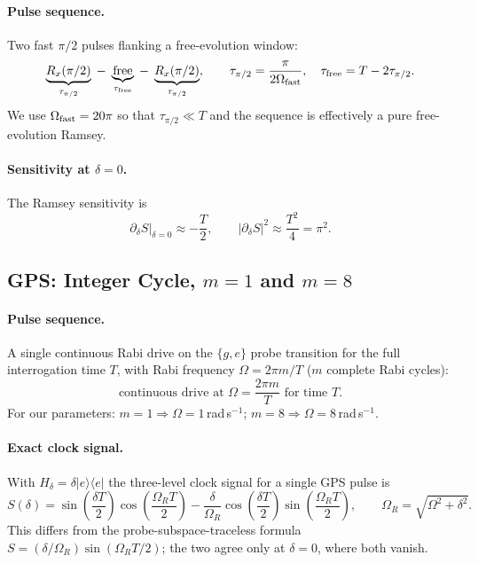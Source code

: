 \documentclass[12pt]{article}
\begin{document}
\paragraph{Pulse sequence.}
Two fast $\pi/2$ pulses flanking a free-evolution window:
\begin{equation}
    \underbrace{R_x(\pi/2)}_{\tau_{\pi/2}}
    \;-\;
    \underbrace{\text{free}}_{\tau_{\rm free}}
    \;-\;
    \underbrace{R_x(\pi/2)}_{\tau_{\pi/2}},
    \qquad
    \tau_{\pi/2} = \frac{\pi}{2\Omega_{\rm fast}},
    \quad
    \tau_{\rm free} = T - 2\tau_{\pi/2}.
    \label{eq:ramsey_seq}
\end{equation}
We use $\Omega_{\rm fast} = 20\pi$ so that $\tau_{\pi/2} \ll T$ and the sequence
is effectively a pure free-evolution Ramsey.

\paragraph{Sensitivity at $\delta = 0$.}
The Ramsey sensitivity is
\begin{equation}
    \left.\partial_\delta S\right|_{\delta=0}
    \approx -\frac{T}{2},
    \qquad
    \left|\partial_\delta S\right|^2 \approx \frac{T^2}{4} = \pi^2.
    \label{eq:ramsey_sens}
\end{equation}


\subsection{GPS: Integer Cycle, $m = 1$ and $m = 8$}

\paragraph{Pulse sequence.}
A single continuous Rabi drive on the $\{g,e\}$ probe transition for the full
interrogation time $T$, with Rabi frequency $\Omega = 2\pi m / T$ ($m$ complete
Rabi cycles):
\begin{equation}
    \text{continuous drive at }\Omega = \frac{2\pi m}{T}\text{ for time }T.
    \label{eq:gps_seq}
\end{equation}
For our parameters: $m=1 \Rightarrow \Omega = 1$\,rad\,s$^{-1}$;
$m=8 \Rightarrow \Omega = 8$\,rad\,s$^{-1}$.

\paragraph{Exact clock signal.}
With $H_\delta = \delta\lvert e\rangle\langle e\rvert$ the three-level clock
signal for a single GPS pulse is
\begin{equation}
    S(\delta) = \sin\!\left(\frac{\delta T}{2}\right)\cos\!\left(\frac{\Omega_R T}{2}\right)
              - \frac{\delta}{\Omega_R}\cos\!\left(\frac{\delta T}{2}\right)
                \sin\!\left(\frac{\Omega_R T}{2}\right),
    \qquad
    \Omega_R = \sqrt{\Omega^2 + \delta^2}.
    \label{eq:gps_signal}
\end{equation}
This differs from the probe-subspace-traceless formula $S = (\delta/\Omega_R)\sin(\Omega_R T/2)$;
the two agree only at $\delta = 0$, where both vanish.
\end{document}
